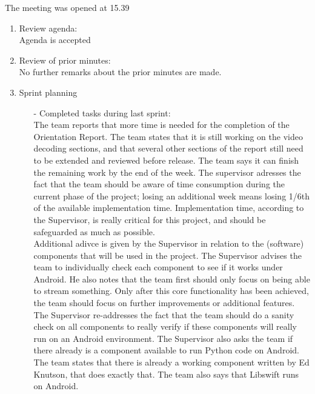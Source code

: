\documentclass[pdftex, 12pt, a4paper]{report}
\begin{document}
\pagestyle{fancy}

The meeting was opened at 15.39

\begin{enumerate}
\item Review agenda:\\		
Agenda is accepted

\item Review of prior minutes:\\		
No further remarks about the prior minutes are made.

\item Sprint planning\\
\begin{enumerate}
\item[-] Completed tasks during last sprint:\\
The team reports that more time is needed for the completion of the Orientation Report. The team states that it is still working on the video decoding sections, and that several other sections of the report still need to be extended and reviewed before release. The team says it can finish the remaining work by the end of the week. The supervisor adresses the fact that the team should be aware of time consumption during the current phase of the project; losing an additional week means losing 1/6th of the available implementation time. Implementation time, according to the Supervisor, is really critical for this project, and should be safeguarded as much as possible.\\

Additional adivce is given by the Supervisor in relation to the (software) components that will be used in the project. The Supervisor advises the team to individually check each component to see if it works under Android. He also notes that the team first should only focus on being able to stream something. Only after this core functionality has been achieved, the team should focus on further improvements or additional features.\\

The Supervisor re-addresses the fact that the team should do a sanity check on all components to really verify if these components will really run on an Android environment. The Supervisor also asks the team if there already is a component available to run Python code on Android. The team states that there is already a working component written by Ed Knutson, that does exactly that. The team also says that Libswift runs on Android.\\


\end{enumerate}
\end{enumerate}
\end{document}
